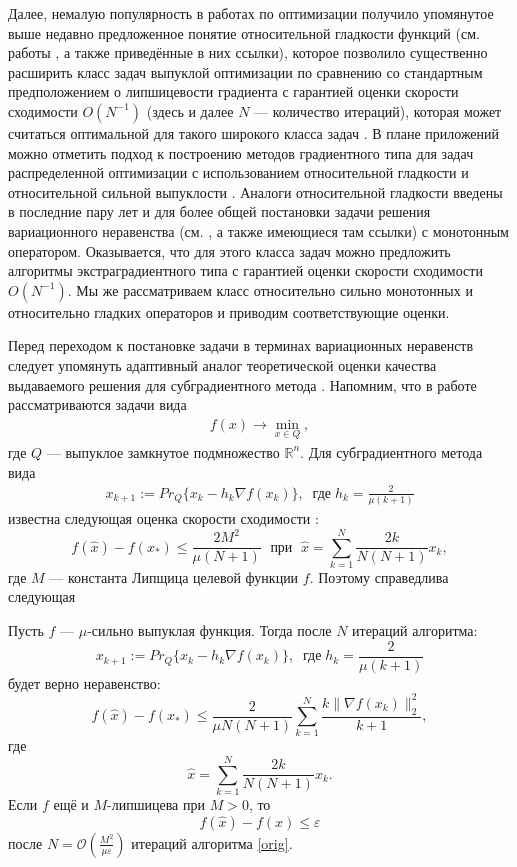 Далее, немалую популярность в работах по оптимизации получило упомянутое выше недавно предложенное понятие относительной гладкости функций (см. работы \cite{Bauschke,Drag,Dragomir,Lu_Nesterov_2018}, а также приведённые в них ссылки), которое позволило существенно расширить класс задач выпуклой оптимизации по сравнению со стандартным предположением о липшицевости градиента с гарантией оценки скорости сходимости $O(N^{-1})$ (здесь и далее $N$ --- количество итераций), которая может считаться оптимальной для такого широкого класса задач \cite{Dragomir}. В плане приложений можно отметить подход к построению методов градиентного типа для задач распределенной оптимизации с использованием относительной гладкости и относительной сильной выпуклости \cite{Hendr}. Аналоги относительной гладкости введены в последние пару лет и для более общей постановки задачи решения вариационного неравенства (см. \cite{Inex}, а также имеющиеся там ссылки) с монотонным оператором. Оказывается, что для этого класса задач можно предложить алгоритмы экстраградиентного типа с гарантией оценки скорости сходимости $O(N^{-1})$. Мы же рассматриваем класс относительно сильно монотонных и относительно гладких операторов и приводим соответствующие оценки.

Перед переходом к постановке задачи в терминах вариационных неравенств следует упомянуть адаптивный аналог \cite{Stonyakin_2021} теоретической оценки качества выдаваемого решения для субградиентного метода \cite{Bach_2012}. Напомним, что в работе рассматриваются задачи вида
\begin{gather}\label{min_q}
    f(x)\rightarrow\min_{x\in Q},
\end{gather}
где $Q$ --- выпуклое замкнутое подмножество $\mathbb{R}^{n}$. Для субградиентного метода вида
\begin{gather}\label{orig}
    x_{k+1} := Pr_{Q}\{x_k - h_k \nabla f(x_k) \}, \;\; \textit{где} \; h_k = \frac{2}{\mu (k+1)}
\end{gather}
известна следующая оценка скорости сходимости \cite{Bach_2012}:
\begin{equation}\label{orig_estimation_f}
    f(\widehat{x}) - f(x_*) \leq \frac{2 M^2}{\mu (N+1)}  \; \text{  при   } \; \widehat{x} = \sum\limits_{k=1}^{N} \frac{2 k}{N (N+1)} x_k, 
\end{equation}
где $M$ --- константа Липщица целевой функции $f$.
Поэтому справедлива следующая
\begin{theorem}\label{ThmBachAdaptive}
    Пусть $f$ --- $\mu$-сильно выпуклая функция. Тогда после $N$ итераций алгоритма:
    $$
        x_{k+1} := Pr_{Q}\{x_k - h_k \nabla f(x_k) \}, \;\; \textit{где} \; h_k = \frac{2}{\mu (k+1)}
    $$
    будет верно неравенство:
    \begin{equation}\label{adaptive_estimation_f}
        f(\widehat{x}) - f(x_*) \leq \frac{2}{\mu N (N+1)} \sum_{k=1}^{N} \frac{k \|\nabla f(x_k)\|_2^2}{k+1},
    \end{equation}
    где
    $$
        \widehat{x} = \sum_{k=1}^{N} \frac{2 k}{N (N+1)} x_k.
    $$
    Если $f$ ещё и $M$-липшицева при $M >0$, то
    $$
         f(\widehat{x}) - f(x) \leq \varepsilon
    $$
    после $N = \mathcal{O}(\frac{M^2}{\mu\varepsilon})$ итераций алгоритма \eqref{orig}.
\end{theorem}

